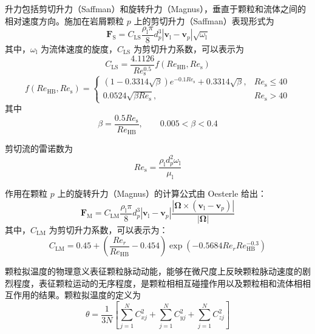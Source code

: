 升力包括剪切升力（Saffman）和旋转升力（Magnus），垂直于颗粒和流体之间的相对速度方向。施加在岩屑颗粒 \(p\) 上的剪切升力（Saffman）表现形式为
\begin{equation}
	\bm{F}_{\mathrm{S}}
	=C_{\mathrm{LS}}\frac{\rho_{\mathrm{l}}\pi}{8}d_{p}^{3}
	\left|\bm{v}_{\mathrm{l}}-\bm{v}_{p}\right|
	\sqrt{\omega_{\mathrm{l}}}
\end{equation}
其中，\(\omega_{\mathrm{l}}\) 为流体速度的旋度，\(C_{\mathrm{LS}}\) 为剪切升力系数，可以表示为
\begin{equation}
	C_{\mathrm{LS}}=\frac{4.1126}{Re_{\mathrm{s}}^{0.5}}f\left(Re_{\mathrm{HB}},Re_{\mathrm{s}}\right)
\end{equation}
\begin{equation}
	f\left(Re_{\mathrm{HB}},Re_{\mathrm{s}}\right)
	=
	\begin{cases}
		\left(1-0.3314\sqrt{\beta}\right)
		e^{-0.1Re_{\mathrm{s}}}
		+0.3314\sqrt{\beta}, & Re_{\mathrm{s}}\leq 40 \\[6pt]
		0.0524\sqrt{\beta Re_{\mathrm{s}}}, & Re_{\mathrm{s}}>40
	\end{cases}
\end{equation}
其中
\begin{equation}
	\beta=\frac{0.5Re_{\mathrm{s}}}{Re_{\mathrm{HB}}},\qquad 0.005<\beta<0.4
\end{equation}

剪切流的雷诺数为
\begin{equation}
	Re_{\mathrm{s}}=\frac{\rho_{\mathrm{l}}d_{p}^{2}\omega_{\mathrm{l}}}{\mu_{\mathrm{l}}}
\end{equation}

作用在颗粒 \(p\) 上的旋转升力（Magnus）的计算公式由 Oesterle 给出：
\begin{equation}
	\bm{F}_{\mathrm{M}}
	=C_{\mathrm{LM}}\frac{\rho_{\mathrm{l}}\pi}{8}d_{p}^{3}
	\left|\bm{v}_{\mathrm{l}}-\bm{v}_{p}\right|
	\frac{\left|\bm{\Omega}\times
		\left(\bm{v}_{\mathrm{l}}-\bm{v}_{p}\right)\right|}
	{\left|\bm{\Omega}\right|}
\end{equation}
其中，\(C_{\mathrm{LM}}\) 为剪切升力系数，可以表示为：
\begin{equation}
	C_{\mathrm{LM}}
	=0.45+\left(\frac{Re_{r}}{Re_{\mathrm{HB}}}-0.454\right)
	\exp\left(-0.5684Re_{r}Re_{\mathrm{HB}}^{-0.3}\right)
\end{equation}

颗粒拟温度的物理意义表征颗粒脉动动能，能够在微尺度上反映颗粒脉动速度的剧烈程度，表征颗粒运动的无序程度，是颗粒相相互碰撞作用以及颗粒相和流体相相互作用的结果。颗粒拟温度的定义为
\begin{equation}
	\theta=\frac{1}{3N}\left[
	\sum_{j=1}^{N}C_{xj}^{2}
	+\sum_{j=1}^{N}C_{yj}^{2}
	+\sum_{j=1}^{N}C_{zj}^{2}
	\right]
\end{equation}


